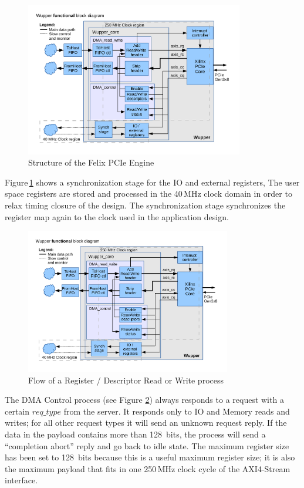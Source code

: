 \begin{figure}[H]
	\centering
\includegraphics[trim=0mm 0cm 0mm 1cm,width=0.85\textwidth, page=1]{figures/wupper_structure.pdf}
\caption{Structure of the Felix PCIe Engine}
	\label{fig:pcie_core_structure}
\end{figure}

Figure\,\ref{fig:pcie_core_structure} shows a synchronization stage for the IO and external registers, The user space registers are stored and processed in the 40\,MHz clock domain in order to relax timing closure of the design. The synchronization stage synchronizes the register map again to the clock used in the application design.

\begin{figure}[H]
	\centering
\includegraphics[trim=0mm 2cm 0mm 1cm, width=0.80\textwidth, page=3]{figures/wupper_structure.pdf}
	\caption{Flow of a Register / Descriptor Read or Write process}
	\label{fig:flow_dma_control}
\end{figure}

The DMA Control process (see Figure \ref{fig:flow_dma_control}) always responds to a request with a certain $req\_type$ from the server. It responds only to IO and Memory reads and writes; for all other request types it will send an unknown request reply. If the data in the payload contains more than 128~bits, the process will send a ``completion abort'' reply and go back to idle state. The maximum register size has been set to 128~bits because this is a useful maximum register size; it is also the maximum payload that fits in one 250\,MHz clock cycle of the AXI4-Stream interface.

